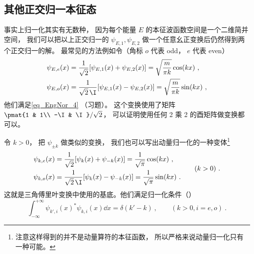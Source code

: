 \subsection{其他正交归一本征态}
事实上归一化其实有无数种， 因为每个能量 $E$ 的本征波函数空间是一个二维简并空间， 我们可以把以上正交归一的 $\psi_{E,1}, \psi_{E,2}$ 做一个任意幺正变换后仍然得到两个正交归一的解。 最常见的方法例如令（角标 $o$ 代表 odd， $e$ 代表 even）
\begin{equation}
\begin{aligned}
\psi_{E,e}(x) &= \frac{1}{\sqrt{2}}[\psi_{E,1}(x) + \psi_{E,2}(x)] = \sqrt{\frac{m}{\pi k}}\cos(kx)~,\\
\psi_{E,o}(x) &= \frac{1}{\sqrt{2}\,\I}[\psi_{E,1}(x) - \psi_{E,2}(x)] = \sqrt{\frac{m}{\pi k}}\sin(kx)~,
\end{aligned}
\end{equation}
他们满足\autoref{eq_EngNor_4} （习题）。 这个变换使用了矩阵 $\pmat{1 & 1\\ -\I & \I}/\sqrt{2}$， 可以证明使用任何 2 乘 2 的酉矩阵做变换都可以。

令 $k > 0$， 把 $\psi_{\pm k}$ 做类似的变换， 我们也可以写出动量归一化的一种变体\footnote{注意这样得到的并不是动量算符的本征函数， 所以严格来说动量归一化只有一种可能。}
\begin{equation}\label{eq_EngNor_5}
\begin{aligned}
\psi_{k,e}(x) &= \frac{1}{\sqrt{2}}[\psi_{k}(x) + \psi_{-k}(x)] = \frac{1}{\sqrt{\pi}}\cos(kx)~,\\
\psi_{k,o}(x) &= \frac{1}{\sqrt{2}\,\I}[\psi_{k}(x) - \psi_{-k}(x)] = \frac{1}{\sqrt{\pi}}\sin(kx)~.
\end{aligned}
\qquad (k > 0)~.
\end{equation}
这就是三角傅里叶变换中使用的基底。他们满足归一化条件（）
\begin{equation}\label{eq_EngNor_3}
\int_{-\infty}^{+\infty} \psi_{k',i}(x)^* \psi_{k,i}(x) \dd{x} = \delta(k' - k) ~,\qquad (k > 0, i = e, o)~.
\end{equation}

